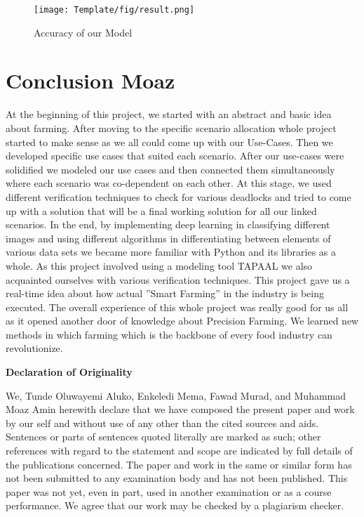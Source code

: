 \documentclass[english]{lni}
\begin{document}
\begin{figure}[h]
    \texttt{[image: Template/fig/result.png]}
    \centering
    \caption{Accuracy of our Model}
\end{figure}

\section{Conclusion Moaz}
At the beginning of this project, we started with an abstract and basic idea about farming. After moving to the specific scenario allocation whole project started to make sense as we all could come up with our Use-Cases. Then we developed specific use cases that suited each scenario. After our use-cases were solidified we modeled our use cases and then connected them simultaneously where each scenario was co-dependent on each other. At this stage, we used different verification techniques to check for various deadlocks and tried to come up with a solution that will be a final working solution for all our linked scenarios. In the end, by implementing deep learning in classifying different images and using different algorithms in differentiating between elements of various data sets we became more familiar with Python and its libraries as a whole. As this project involved using a modeling tool TAPAAL we also acquainted ourselves with various verification techniques. This project gave us a real-time idea about how actual ''Smart Farming'' in the industry is being executed. The overall experience of this whole project was really good for us all as it opened another door of knowledge about Precision Farming. We learned new methods in which farming which is the backbone of every food industry can revolutionize.


\begin{center}
\textbf{Declaration of Originality}
\end{center}

We, Tunde Oluwayemi Aluko, Enkeledi Mema, Fawad Murad, and Muhammad Moaz Amin herewith declare that we have composed the present paper and work by our self and without use of any other than the cited sources and aids. Sentences or parts of sentences quoted literally are marked as such; other references with regard to the statement and scope are indicated by full details of the publications concerned. The paper and work in the same or similar form has not been submitted to any examination body and has not been published. This paper was not yet, even in part, used in another examination or as a course performance. We agree that our work may be checked by a plagiarism checker. 


\end{document}
